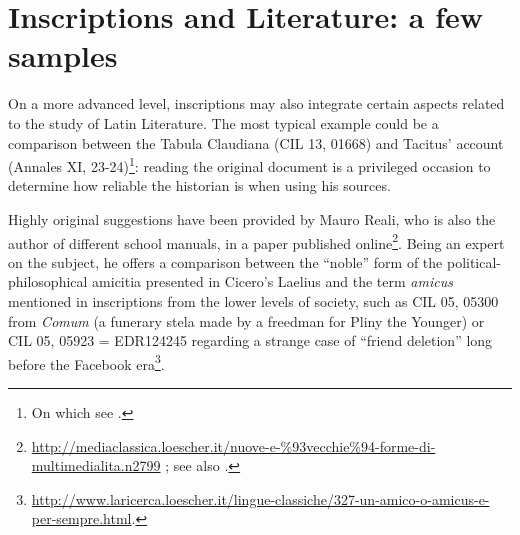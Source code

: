 \documentclass[amsthm,ebook]{saparticle}
\begin{document}
\section{Inscriptions and Literature: a few samples}
\noindent On a more advanced level, inscriptions may also integrate certain aspects related to the study of Latin Literature. The
most typical example could be a comparison between the Tabula Claudiana (CIL 13, 01668) and Tacitus’ account (Annales
XI, 23-24)\footnote{ On which see \citet{Jahn1993}.}: reading the original document is a privileged occasion to determine how
reliable the historian is when using his sources.

Highly original suggestions have been provided by Mauro Reali, who is also the author of different school manuals, in a
paper published online\footnote{\url{http://mediaclassica.loescher.it/nuove-e-\%93vecchie\%94-forme-di-multimedialita.n2799}
; see also \citep{Reali2015}.}. Being an expert on the subject, he offers a comparison between the ``noble'' form of
the political-philosophical amicitia presented in Cicero’s Laelius and the term \emph{amicus} mentioned in inscriptions
from the lower levels of society, such as CIL 05, 05300 from \emph{Comum} (a funerary stela made by a freedman for
Pliny the Younger) or CIL 05, 05923 = EDR124245 regarding a strange case of ``friend deletion'' long before the Facebook
era\footnote{ \url{http://www.laricerca.loescher.it/lingue-classiche/327-un-amico-o-amicus-e-per-sempre.html}.}.
\end{document}
